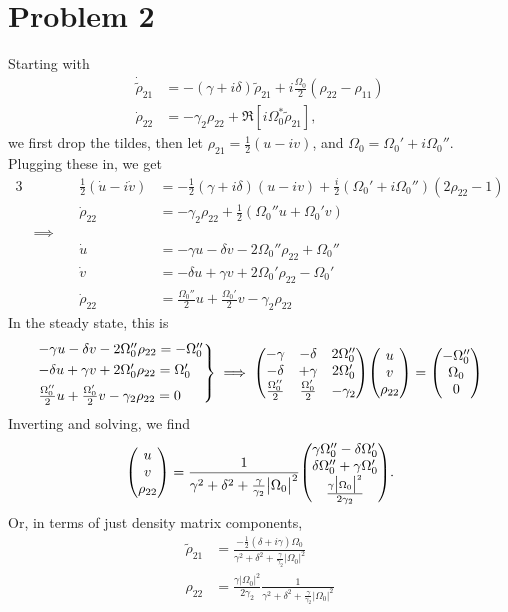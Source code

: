 \documentclass[12pt]{article}
\newcommand{\magsq}[1]{\big|#1\big|^2}
\begin{document}
\section*{Problem 2}
Starting with
\begin{align*}
    \dot{\tilde{\rho}}_{21} &= -(\gamma+i\delta) \tilde{\rho}_{21} + i \frac{\Omega_0}{2}\left(\rho_{22}-\rho_{11}\right) \\
    \dot{\rho}_{22} &= -\gamma_2\rho_{22} + \Re[i\Omega_0^*\tilde{\rho}_{21}],
\end{align*}
we first drop the tildes, then let $\rho_{21} = \frac{1}{2}(u - iv)$, and $\Omega_0 = \Omega_0' + i\Omega_0''$. Plugging these in, we get
\begin{alignat*}{3}
    &\quad & \frac{1}{2}(\dot{u} - i\dot{v}) &= -\frac{1}{2}(\gamma + i\delta)(u-iv) + \frac{i}{2}\left(\Omega_0' + i\Omega_0''\right)\left(2\rho_{22} - 1\right) \\
    &\quad & \dot{\rho}_{22} &= -\gamma_2\rho_{22} + \frac{1}{2}\left(\Omega_0'' u + \Omega_0' v\right) \\
    &\implies\quad & &  \\
    &\quad & \dot{u} &= -\gamma u - \delta v - 2\Omega_0''\rho_{22} + \Omega_0'' \\
    &\quad & \dot{v} &= -\delta u + \gamma v + 2\Omega_0' \rho_{22} - \Omega_0'  \\
    &\quad & \dot{\rho}_{22} &= \frac{\Omega_0''}{2} u + \frac{\Omega_0'}{2}v - \gamma_2\rho_{22}
\end{alignat*}
In the steady state, this is   
\[
\begin{rcases*}
    -\gamma u -\delta v - 2\Omega_0''\rho_{22} = -\Omega_0'' \\
    -\delta u + \gamma v + 2\Omega_0'\rho_{22} = \Omega_0' \\
    \frac{\Omega_0''}{2} u + \frac{\Omega_0'}{2} v - \gamma_2\rho_{22} = 0
\end{rcases*}
\implies
\mqty(-\gamma&-\delta&2\Omega_0''\\-\delta&+\gamma&2\Omega_0'\\\frac{\Omega_0''}{2}&\frac{\Omega_0'}{2}&-\gamma_2)\mqty(u\\v\\\rho_{22}) = \mqty(-\Omega_0''\\\Omega_0\\0)
\]
Inverting and solving, we find
\[ \mqty(u\\v\\\rho_{22}) = \frac{1}{\gamma^2 + \delta^2 + \frac{\gamma}{\gamma_2}\magsq{\Omega_0}}\mqty(\gamma\Omega_0'' - \delta\Omega_0' \\ \delta\Omega_0'' + \gamma\Omega_0' \\ \frac{\gamma\magsq{\Omega_0}}{2\gamma_2}). \]
Or, in terms of just density matrix components,
\begin{align*}
    \tilde{\rho}_{21} &= \frac{-\frac{1}{2}(\delta+i\gamma)\Omega_0}{\gamma^2 + \delta^2 + \frac{\gamma}{\gamma_2}\magsq{\Omega_0}} \\
    \rho_{22} &= \frac{\gamma\magsq{\Omega_0}}{2\gamma_2}\frac{1}{\gamma^2 + \delta^2 + \frac{\gamma}{\gamma_2}\magsq{\Omega_0}} \\
\end{align*}
\end{document}
